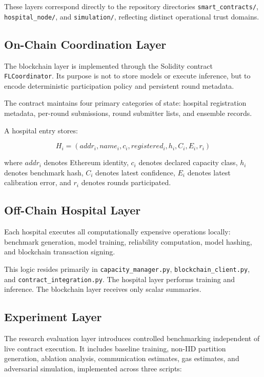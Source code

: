 \documentclass[conference]{IEEEtran}
\begin{document}
These layers correspond directly to the repository directories \texttt{smart\_contracts/}, \texttt{hospital\_node/}, and \texttt{simulation/}, reflecting distinct operational trust domains.

\subsection{On-Chain Coordination Layer}

The blockchain layer is implemented through the Solidity contract \texttt{FLCoordinator}. Its purpose is not to store models or execute inference, but to encode deterministic participation policy and persistent round metadata.

The contract maintains four primary categories of state: hospital registration metadata, per-round submissions, round submitter lists, and ensemble records.

A hospital entry stores:

\begin{equation}
H_i=(addr_i,name_i,c_i,registered_i,h_i,C_i,E_i,r_i)
\end{equation}

where $addr_i$ denotes Ethereum identity, $c_i$ denotes declared capacity class, $h_i$ denotes benchmark hash, $C_i$ denotes latest confidence, $E_i$ denotes latest calibration error, and $r_i$ denotes rounds participated.

\subsection{Off-Chain Hospital Layer}

Each hospital executes all computationally expensive operations locally: benchmark generation, model training, reliability computation, model hashing, and blockchain transaction signing.

This logic resides primarily in \texttt{capacity\_manager.py}, \texttt{blockchain\_client.py}, and \texttt{contract\_integration.py}. The hospital layer performs training and inference. The blockchain layer receives only scalar summaries.

\subsection{Experiment Layer}

The research evaluation layer introduces controlled benchmarking independent of live contract execution. It includes baseline training, non-IID partition generation, ablation analysis, communication estimates, gas estimates, and adversarial simulation, implemented across three scripts:
\end{document}
